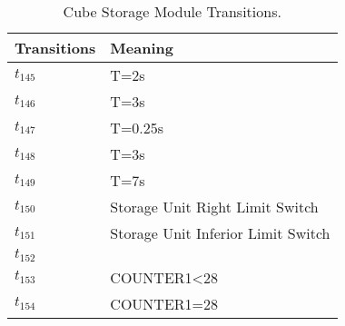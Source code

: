 \begin{table}[H]
\caption{Cube Storage Module Transitions.}
\centering
\begin{tabular}{M{5cm}M{10cm}}
Transitions & Meaning\\
\hline
\hyperlink{partialNet:tt1451}{\hypertarget{partialTable:tt145}{$t_{145}$}} & T=2s\\
\hyperlink{partialNet:tt1461}{\hypertarget{partialTable:tt146}{$t_{146}$}} & T=3s\\
\hyperlink{partialNet:tt1471}{\hypertarget{partialTable:tt147}{$t_{147}$}} & T=0.25s\\
\hyperlink{partialNet:tt1481}{\hypertarget{partialTable:tt148}{$t_{148}$}} & T=3s\\
\hyperlink{partialNet:tt1491}{\hypertarget{partialTable:tt149}{$t_{149}$}} & T=7s\\
\hyperlink{partialNet:t1501}{\hypertarget{partialTable:t150}{$t_{150}$}} & Storage Unit Right Limit Switch\\
\hyperlink{partialNet:t1511}{\hypertarget{partialTable:t151}{$t_{151}$}} & Storage Unit Inferior Limit Switch\\
\hyperlink{partialNet:t1521}{\hypertarget{partialTable:t152}{$t_{152}$}} & \\
\hyperlink{partialNet:t1531}{\hypertarget{partialTable:t153}{$t_{153}$}} & COUNTER1<28\\
\hyperlink{partialNet:t1541}{\hypertarget{partialTable:t154}{$t_{154}$}} & COUNTER1=28\\
\end{tabular}
\end{table}
